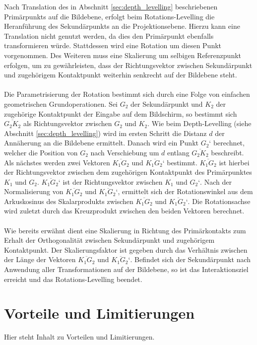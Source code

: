 Nach Translation des in Abschnitt \ref{sec:depth_levelling} beschriebenen Primärpunkts auf die Bildebene, erfolgt beim Rotations-Levelling die Heranführung des Sekundärpunkts an die Projektionsebene. Hierzu kann eine Translation nicht genutzt werden, da dies den Primärpunkt ebenfalls transformieren würde. Stattdessen wird eine Rotation um diesen Punkt vorgenommen. Des Weiteren muss eine Skalierung um selbigen Referenzpunkt erfolgen, um zu gewährleisten, dass der Richtungsvektor zwischen Sekundärpunkt und zugehörigem Kontaktpunkt weiterhin senkrecht auf der Bildebene steht. 
\\\\
Die Parametrisierung der Rotation bestimmt sich durch eine Folge von einfachen geometrischen Grundoperationen.  Sei $G_2$ der Sekundärpunkt und $K_2$ der zugehörige Kontaktpunkt der Eingabe auf dem Bildschirm, so bestimmt sich $\overline{G_2K_2}$ als Richtungsvektor zwischen $G_2$ und $K_2$. Wie beim Depth-Levelling (siehe Abschnitt \ref{sec:depth_levelling}) wird im ersten Schritt die Distanz $d$ der Annäherung an die Bildebene ermittelt. Danach wird ein Punkt $G_2‘$ berechnet, welcher die Position von $G_2$ nach Verschiebung um $d$ entlang $\overline{G_2K_2}$ beschreibt. Als nächstes werden zwei Vektoren $\overline{K_1G_2}$ und $\overline{K_1G_2‘}$ bestimmt. $\overline{K_1G_2}$ ist hierbei der Richtungsvektor zwischen dem zugehörigen Kontaktpunkt des Primärpunktes $K_1$ und $G_2$. $\overline{K_1G_2‘}$ ist der Richtungsvektor zwischen $K_1$ und $G_2‘$. Nach der Normalisierung von $\overline{K_1G_2}$ und $\overline{K_1G_2‘}$,  ermittelt sich der Rotationswinkel aus dem Arkuskosinus des Skalarprodukts zwischen $\overline{K_1G_2}$ und $\overline{K_1G_2‘}$. Die Rotationsachse wird zuletzt durch das Kreuzprodukt zwischen den beiden Vektoren berechnet.
\\\\
Wie bereits erwähnt dient eine Skalierung in Richtung des Primärkontakts zum Erhalt der Orthogonalität zwischen Sekundärpunkt und zugehörigem Kontaktpunkt. Der Skalierungsfaktor ist gegeben durch das Verhältnis zwischen der Länge der Vektoren $\overline{K_1G_2}$ und $\overline{K_1G_2‘}$. Befindet sich der Sekundärpunkt nach Anwendung aller Transformationen auf der Bildebene, so ist das Interaktionsziel erreicht und das Rotations-Levelling beendet.


\section{Vorteile und Limitierungen}
\label{sec:vorteile_und_limitierungen_implizit}

Hier steht Inhalt zu Vorteilen und Limitierungen.